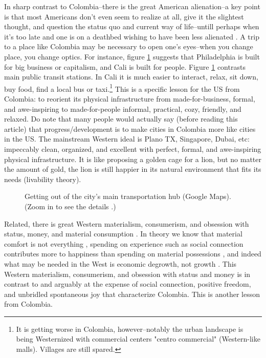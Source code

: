 \documentclass[10pt, letterpaper]{article}
\begin{document}
\begin{spacing}{2}
In sharp contrast to Colombia--there is the great American alienation--a key
point is that most Americans don't even seem to realize at all, give it
the slightest thought, and question the status quo and current way of
life--untill perhaps when it's too late and one is on a deathbed wishing to have
been less alienated \citep{ware12}. A trip to a place like Colombia may be necessary to open
one's eyes--when you change place, you change optics.
For instance, figure \ref{terX} suggests that Philadelphia is built for
big business or capitalism, and Cali is built for people. {Figure \ref{terX} contrasts main
  public transit stations. In Cali it is much easier to interact, relax, sit
  down, buy food, find a local bus or taxi.\footnote{It is getting worse in
    Colombia, however--notably the urban landscape is being Westernized with commercial centers "centro commercial" (Western-like malls). Villages are still spared.}
}
 This is a specific lesson for the US from Colombia: to reorient its physical
infrastructure from made-for-business, formal, and awe-inspiring to
made-for-people informal, practical, cozy, friendly, and  relaxed. Do note that
many people would actually say (before reading this article) that
progress/development is to make cities in Colombia more like cities in the US. The mainstream Western ideal is Plano TX, Singapore, Dubai, etc: impeccably
clean, organized, and excellent with perfect, formal, and awe-inspiring physical
infrastructure. It is like proposing a golden cage for a lion, but no matter the amount of
gold, the lion is still happier in its natural environment that fits its needs
(livability theory). 

\begin{figure}[h]\centering\caption{Getting out of the city's main
    transportation hub (Google Maps). (Zoom in to see the details%
    .)}\label{terX}
\end{figure}

Related, there is great Western materialism, consumerism, and obsession with status,
money, and material consumption \citep{leonard10,frank12}. In theory we know that material comfort is not everything \citep{stiglitz09al},  spending on experience such as social
connection contributes more to happiness than spending on material possessions 
\citep{ware12,vanboven05,kumar14,bhattacharjee14}, and indeed what may be needed in the West is economic
degrowth, not growth \citep{kallis12,kallis11}.
 This Western materialism, consumerism, and obsession with status and money is in contrast to and arguably at the expense of social
connection, positive freedom, and unbridled spontaneous joy that characterize
Colombia. This is another lesson from Colombia. 


\end{spacing}
\end{document}
